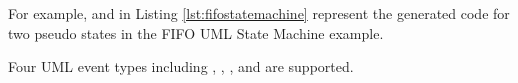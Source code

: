 \begin{comment}
\begin{itemize}[\footnotesize]
	\item \ti{pseudo state} $\rightarrow$ \tf{'pseudo\_keyword' name} 
	
	
	
	
	
	
	
	
	
\end{itemize}
\end{comment}

For example,  and  in Listing \ref{lst:fifostatemachine} represent the generated code for two  pseudo states in the FIFO UML State Machine example.  

\vskip 0.2cm
\noindent
{}
Four UML event types including , , , and  are supported.

